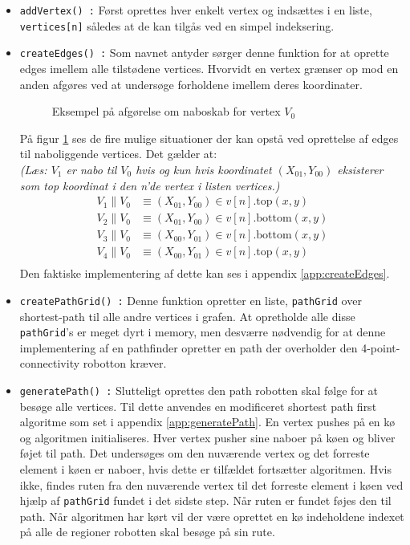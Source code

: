 \begin{itemize}
	\item \texttt{addVertex() :} Først oprettes hver enkelt vertex og indsættes i en liste, \texttt{vertices[n]} således at de kan tilgås ved en simpel indeksering.
	\item \texttt{createEdges() :} Som navnet antyder sørger denne funktion for at oprette edges imellem alle tilstødene vertices. Hvorvidt en vertex grænser op mod en anden afgøres ved at undersøge forholdene imellem deres koordinater. 
\begin{figure}[h!]
	\label{fig:coordRelation}
	\caption{Eksempel på afgørelse om naboskab for vertex $V_0$}
\end{figure}
På figur \ref{fig:coordRelation} ses de fire mulige situationer der kan opstå ved oprettelse af edges til naboliggende vertices. Det gælder at: \\
\scriptsize\emph{(Læs: $V_1$ er nabo til $V_0$ hvis og kun hvis koordinatet $(X_{01},Y_{00})$ eksisterer som top koordinat i den n'de vertex i listen vertices.)}
\normalsize	 	 
	 \begin{align*}
	 V_1\parallel V_0 & \equiv(X_{01},Y_{00})\in v[n].\text{top}(x,y)	 \\
	 V_2\parallel V_0 & \equiv(X_{01},Y_{00})\in v[n].\text{bottom}(x,y)\\
	 V_3\parallel V_0 & \equiv(X_{00},Y_{01})\in v[n].\text{bottom}(x,y)\\
	 V_4\parallel V_0 & \equiv(X_{00},Y_{01})\in v[n].\text{top}(x,y)\\
	 \end{align*}
Den faktiske implementering af dette kan ses i appendix \ref{app:createEdges}.
	 \item \texttt{createPathGrid() :} Denne funktion opretter en liste, \texttt{pathGrid} over shortest-path til alle andre vertices i grafen. At opretholde alle disse \texttt{pathGrid}'s er meget dyrt i memory, men desværre nødvendig for at denne implementering af en pathfinder opretter en path der overholder den 4-point-connectivity robotton kræver.
	 \item \texttt{generatePath() :} Slutteligt oprettes den path robotten skal følge for at besøge alle vertices. Til dette anvendes en modificeret shortest path first algoritme som set i appendix \ref{app:generatePath}. En vertex pushes på en kø og algoritmen initialiseres. Hver vertex pusher sine naboer på køen og bliver føjet til path. Det undersøges om den nuværende vertex og det forreste element i køen er naboer, hvis dette er tilfældet fortsætter algoritmen. Hvis ikke, findes ruten fra den nuværende vertex til det forreste element i køen ved hjælp af \texttt{pathGrid} fundet i det sidste step. Når ruten er fundet føjes den til path. Når algoritmen har kørt vil der være oprettet en kø indeholdene indexet på alle de regioner robotten skal besøge på sin rute.
\end{itemize}
